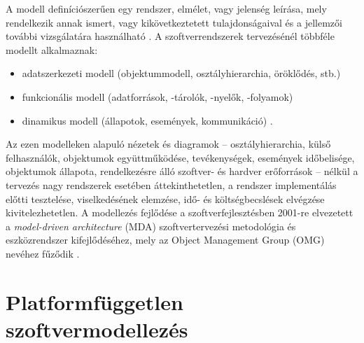 A modell definíciószerűen egy rendszer, elmélet, vagy jelenség leírása, mely rendelkezik annak ismert, vagy kikövetkeztetett tulajdonságaival és a jellemzői további vizsgálatára használható \cite{dict:Model}. 
A szoftverrendszerek tervezésénél többféle modellt alkalmaznak:
\begin{itemize}
	\item adatszerkezeti modell (objektummodell, osztályhierarchia, öröklődés, stb.)
	\item funkcionális modell (adatforrások, -tárolók, -nyelők, -folyamok)
	\item dinamikus modell (állapotok, események, kommunikáció) \cite{Kondorosi07}.
\end{itemize}
Az ezen modelleken alapuló nézetek és diagramok -- osztályhierarchia, külső felhasználók, objektumok együttműködése, tevékenységek, események időbelisége, objektumok állapota, rendelkezésre álló szoftver- és hardver erőforrások -- nélkül a tervezés nagy rendszerek esetében áttekinthetetlen, a rendszer implementálás előtti tesztelése, viselkedésének elemzése, idő- és költségbecslések elvégzése kivitelezhetetlen. 
A modellezés fejlődése a szoftverfejlesztésben 2001-re elvezetett a \emph{model-driven architecture} (\gls{MDA}) szoftvertervezési metodológia és eszközrendszer kifejlődéséhez, mely az Object Management Group (\gls{OMG}) nevéhez fűződik \cite{wiki:ModelDrivenArchitecture}.


\section{Platformfüggetlen szoftvermodellezés}

